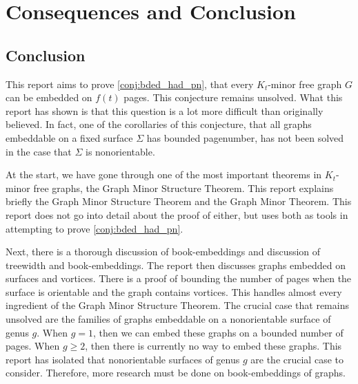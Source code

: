 \chapter{Consequences and Conclusion}\label{chap:conclusion}



\section{Conclusion}
This report aims to prove \cref{conj:bded_had_pn}, that every $K_t$-minor free graph $G$ can be embedded on $f(t)$ pages. This conjecture remains unsolved. What this report has shown is that this question is a lot more difficult than originally believed. In fact, one of the corollaries of this conjecture, that all graphs embeddable on a fixed surface $\Sigma$ has bounded pagenumber, has not been solved in the case that $\Sigma$ is nonorientable. 

At the start, we have gone through one of the most important theorems in $K_t$-minor free graphs, the Graph Minor Structure Theorem. This report explains briefly the Graph Minor Structure Theorem and the Graph Minor Theorem. This report does not go into detail about the proof of either, but uses both as tools in attempting to prove \cref{conj:bded_had_pn}. 

Next, there is a thorough discussion of book-embeddings and discussion of treewidth and book-embeddings. The report then discusses graphs embedded on surfaces and vortices. There is a proof of bounding the number of pages when the surface is orientable and the graph contains vortices. This handles almost every ingredient of the Graph Minor Structure Theorem. The crucial case that remains unsolved are the families of graphs embeddable on a nonorientable surface of genus $g$. When $g = 1$, then we can embed these graphs on a bounded number of pages. When $g \geq 2$, then there is currently no way to embed these graphs. This report has isolated that nonorientable surfaces of genus $g$ are the crucial case to consider. Therefore, more research must be done on book-embeddings of graphs. 